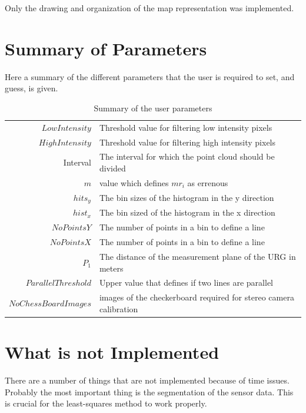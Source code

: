Only the drawing and organization of the map representation was implemented.


\section{Summary of Parameters}
Here a summary of the different parameters that the user is required to set, and guess, is
given. 
\begin{table}[htbp]
    \centering
    \begin{tabular}{|r|l|}
        \hline
        $LowIntensity$ &  Threshold value for filtering low intensity pixels   \\
        $HighIntensity$ & Threshold value for filtering high intensity pixels  \\
        Interval      &  The interval for which the point cloud should be divided \\
        $m$             &  value which defines $m r_i$ as errenous             \\
        \hline
        $hits_y$    &  The bin sizes of the histogram in the y direction       \\
        $hist_x$    &  The bin sized of the histogram in the x direction       \\
        $NoPointsY$ &  The number of points in a bin to define a line          \\
        $NoPointsX$ &  The number of points in a bin to define a line         \\
        $P_1$       &  The distance of the measurement plane of the URG in meters\\
        $ParallelThreshold$ &  Upper value that defines if two lines are parallel \\
        \hline
        $NoChessBoardImages$ & images of the checkerboard required for stereo camera calibration         \\
        \hline
    \end{tabular}
    \caption{Summary of the user parameters}
    \label{chap6:tab-user-parameters}
\end{table}

\section{What is not Implemented}
There are a number of things that are not implemented because of time issues. Probably the
most important thing is the segmentation of the sensor data. This is crucial for the
least-squares method to work properly. 

